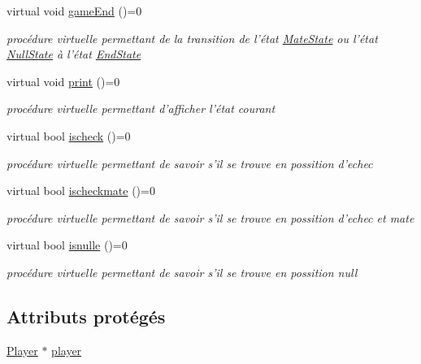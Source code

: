 \begin{DoxyCompactItemize}
virtual void \hyperlink{class_state_a5117e1f9bf06e17b4b0277838fe39bd8}{game\-End} ()=0
\begin{DoxyCompactList}\small\item\em procédure virtuelle permettant de la transition de l'état \hyperlink{class_mate_state}{Mate\-State} ou l'état \hyperlink{class_null_state}{Null\-State} à l'état \hyperlink{class_end_state}{End\-State} \end{DoxyCompactList}\item 
virtual void \hyperlink{class_state_a95a537bb55b9118b23d5bed88ba3b335}{print} ()=0
\begin{DoxyCompactList}\small\item\em procédure virtuelle permettant d'afficher l'état courant \end{DoxyCompactList}\item 
virtual bool \hyperlink{class_state_ad2d7084c507d8d20be2e772d953129fb}{ischeck} ()=0
\begin{DoxyCompactList}\small\item\em procédure virtuelle permettant de savoir s'il se trouve en possition d'echec \end{DoxyCompactList}\item 
virtual bool \hyperlink{class_state_ae1d813f250db75015ddeebece5ec0f2b}{ischeckmate} ()=0
\begin{DoxyCompactList}\small\item\em procédure virtuelle permettant de savoir s'il se trouve en possition d'echec et mate \end{DoxyCompactList}\item 
virtual bool \hyperlink{class_state_a869f2ebfad7e60719df5f89a613adee1}{isnulle} ()=0
\begin{DoxyCompactList}\small\item\em procédure virtuelle permettant de savoir s'il se trouve en possition null \end{DoxyCompactList}\end{DoxyCompactItemize}
\subsection*{Attributs protégés}
\begin{DoxyCompactItemize}
\item 
\hyperlink{class_player}{Player} $\ast$ \hyperlink{class_state_a9a024fd38161f32fc10b68b4ccb13226}{player}
\end{DoxyCompactItemize}


